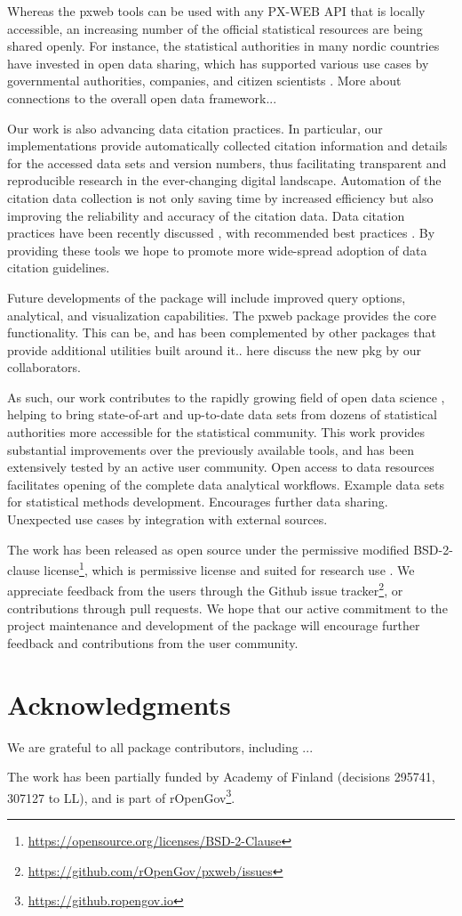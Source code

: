 \documentclass[article]{jss}
\begin{document}
Whereas the pxweb tools can be used with any PX-WEB API that is locally accessible, an increasing number of the official statistical resources are being shared openly. For instance, the statistical authorities in many nordic countries have invested in open data sharing, which has supported various use cases by governmental authorities, companies, and citizen scientists \cite{xxx}. More about connections to the overall open data framework...

Our work is also advancing data citation practices. In particular, our implementations provide automatically collected citation information and details for the accessed data sets and version numbers, thus facilitating transparent and reproducible research in the ever-changing digital landscape. Automation of the citation data collection  is not only saving time by increased efficiency but also improving the reliability and accuracy of the citation data. Data citation practices have been recently discussed \cite{xxx}, with recommended best practices \cite{xxx}. By providing these tools we hope to promote more wide-spread adoption of data citation guidelines.

Future developments of the package will include improved query options, analytical, and visualization capabilities. The pxweb package provides the core functionality. This can be, and has been complemented by other packages that provide additional utilities built around it.. here discuss the new pkg by our collaborators.

As such, our work contributes to the rapidly growing field of open data science \cite{Lahti2018IDA}, helping to bring state-of-art and up-to-date data sets from dozens of statistical authorities more accessible for the statistical community. This work provides substantial improvements over the previously available tools, and has been extensively tested by an active user community. Open access to data resources facilitates opening of the complete data analytical workflows. Example data sets for statistical methods development. Encourages further data sharing. Unexpected use cases by integration with external sources.

The work has been released as open source under the permissive modified BSD-2-clause license\footnote{\url{https://opensource.org/licenses/BSD-2-Clause}}, which is permissive license and suited for research use \cite{Morin2012}. We appreciate feedback from the users through the Github issue tracker\footnote{\url{https://github.com/rOpenGov/pxweb/issues}}, or contributions through pull requests. We hope that our active commitment to the project maintenance and development of the package will encourage further feedback and contributions from the user community.

\section*{Acknowledgments}

We are grateful to all package contributors, including ... 

The work has been partially funded by Academy of Finland (decisions 295741, 307127 to LL), and is part of rOpenGov\footnote{\url{https://github.ropengov.io}}.



\end{document}
